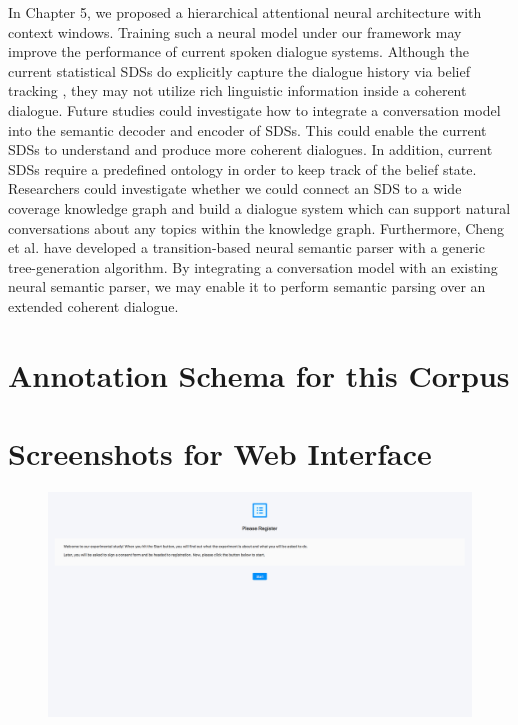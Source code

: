 \documentclass[bsc,frontabs,twoside,singlespacing,parskip,deptreport]{infthesis}     %
\begin{document}
In Chapter 5, we proposed a hierarchical attentional neural architecture with context windows. Training such a neural model under our framework may improve the performance of current spoken dialogue systems. Although the current statistical SDSs do explicitly capture the dialogue history via belief tracking \cite{gasic}, they may not utilize rich linguistic information inside a coherent dialogue. Future studies could investigate how to integrate a conversation model into the semantic decoder and encoder of SDSs. This could enable the current SDSs to understand and produce more coherent dialogues. In addition, current SDSs require a predefined ontology in order to keep track of the belief state. Researchers could investigate whether we could connect an SDS to a wide coverage knowledge graph and build a dialogue system which can support natural conversations about any topics within the knowledge graph. Furthermore, Cheng et al. \cite{cheng2019learning} have developed a transition-based neural semantic parser with a generic tree-generation algorithm. By integrating a conversation model with an existing neural semantic parser, we may enable it to perform semantic parsing over an extended coherent dialogue.




%





\appendix
\chapter{Annotation Schema for this Corpus}
\label{appendix:annotation}


\chapter{Screenshots for Web Interface}
\label{fig:interface}

\begin{figure}[h]
    \centering
    \includegraphics[width=\textwidth]{regi.png}
    
    
    \label{fig:regi}
\end{figure}
\end{document}
